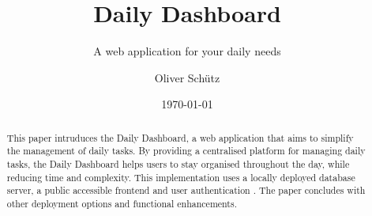 

\titlehead{BSc Computational and Data Science\\Course: Computer Science (cds-205)\\Instructor: Ana Petrus\hfill}
\title{Daily Dashboard}
\subtitle{A web application for your daily needs}
\author[1,*]{Oliver Schütz}
\date{\today}
\maketitle

\begin{abstract}
    This paper intruduces the Daily Dashboard, a web application that aims to simplify the management of daily tasks.
    By providing a centralised platform for managing daily tasks, the Daily Dashboard helps users to stay organised throughout the day, while reducing time and complexity.
    This implementation uses a locally deployed database server, a public accessible frontend and user authentication . The paper concludes with other deployment options and functional enhancements.
\end{abstract}
